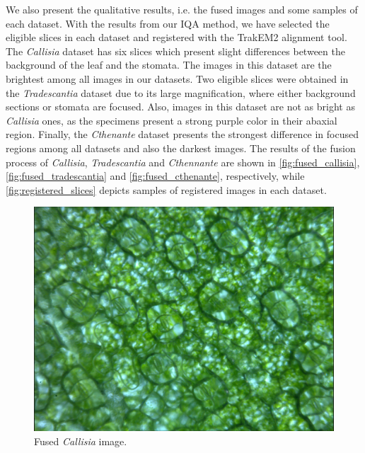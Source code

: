 We also present the qualitative results, i.e. the fused images and some samples of each dataset. With the results from our IQA method, we have selected the eligible slices in each dataset and registered with the TrakEM2 alignment tool. The \textit{Callisia} dataset has six slices which present slight differences between the background of the leaf and the stomata. The images in this dataset are the brightest among all images in our datasets. Two eligible slices were obtained in the \textit{Tradescantia} dataset due to its large magnification, where either background sections or stomata are focused. Also, images in this dataset are not as bright as \textit{Callisia} ones, as the specimens present a strong purple color in their abaxial region. Finally, the \textit{Cthenante} dataset presents the strongest difference in focused regions among all datasets and also the darkest images. The results of the fusion process of \textit{Callisia}, \textit{Tradescantia} and \textit{Cthennante} are shown in \autoref{fig:fused_callisia}, \autoref{fig:fused_tradescantia} and \autoref{fig:fused_cthenante}, respectively, while \autoref{fig:registered_slices} depicts samples of registered images in each dataset. 

\begin{figure}[H]
  \centering
  \caption{Fused \textit{Callisia} image.}
  \label{fig:fused_callisia}
  \includegraphics[scale=0.3]{images/fused_callisia.png}
  \centering
  \fautor
\end{figure}

